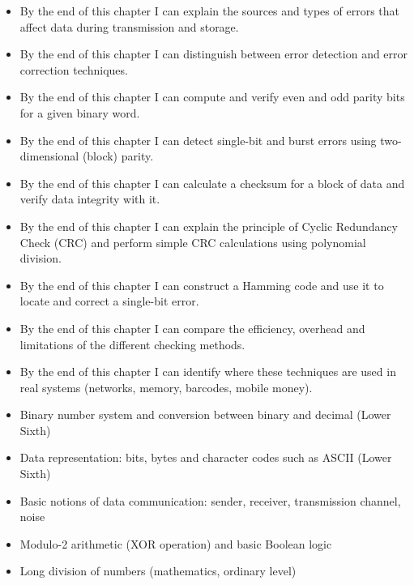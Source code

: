 \documentclass[11pt]{article}
\begin{document}
\begin{objectifs}
\begin{itemize}
\item By the end of this chapter I can explain the sources and types of errors that affect data during transmission and storage.
\item By the end of this chapter I can distinguish between error detection and error correction techniques.
\item By the end of this chapter I can compute and verify even and odd parity bits for a given binary word.
\item By the end of this chapter I can detect single-bit and burst errors using two-dimensional (block) parity.
\item By the end of this chapter I can calculate a checksum for a block of data and verify data integrity with it.
\item By the end of this chapter I can explain the principle of Cyclic Redundancy Check (CRC) and perform simple CRC calculations using polynomial division.
\item By the end of this chapter I can construct a Hamming code and use it to locate and correct a single-bit error.
\item By the end of this chapter I can compare the efficiency, overhead and limitations of the different checking methods.
\item By the end of this chapter I can identify where these techniques are used in real systems (networks, memory, barcodes, mobile money).
\end{itemize}
\end{objectifs}

\begin{prerequis}
\begin{itemize}
\item Binary number system and conversion between binary and decimal (Lower Sixth)
\item Data representation: bits, bytes and character codes such as ASCII (Lower Sixth)
\item Basic notions of data communication: sender, receiver, transmission channel, noise
\item Modulo-2 arithmetic (XOR operation) and basic Boolean logic
\item Long division of numbers (mathematics, ordinary level)
\end{itemize}
\end{prerequis}

\newpage
\end{document}
